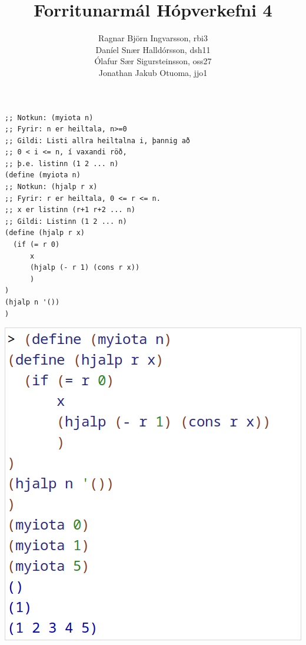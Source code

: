 \documentclass{article}
\title{Forritunarmál Hópverkefni 4}
\author{Ragnar Björn Ingvarsson, rbi3 \\
		Daníel Snær Halldórsson, dsh11 \\
		Ólafur Sær Sigursteinsson, oss27 \\
		Jonathan Jakub Otuoma, jjo1}
\begin{document}
\renewcommand\thepage{}
	
	\maketitle

	\newpage
	\setcounter{page}{1}
	\renewcommand\thepage{\arabic{page}}

	\section{}
	\begin{verbatim}
;; Notkun: (myiota n)
;; Fyrir: n er heiltala, n>=0
;; Gildi: Listi allra heiltalna i, þannig að
;; 0 < i <= n, í vaxandi röð,
;; þ.e. listinn (1 2 ... n)
(define (myiota n)
;; Notkun: (hjalp r x)
;; Fyrir: r er heiltala, 0 <= r <= n.
;; x er listinn (r+1 r+2 ... n)
;; Gildi: Listinn (1 2 ... n)
(define (hjalp r x)
  (if (= r 0)
      x
      (hjalp (- r 1) (cons r x))
      )
)
(hjalp n '())
)
	\end{verbatim}
	\begin{center}
		\includegraphics[scale=0.35]{myiota.png}
	\end{center}

	\newpage
\end{document}
